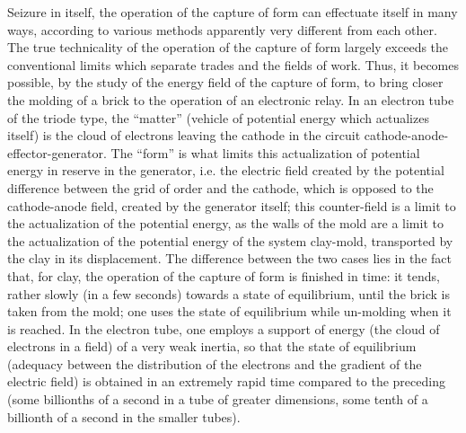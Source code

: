 \documentclass[a4paper]{article}
\begin{document}
Seizure in itself, the operation of the capture of form can effectuate itself in many ways, according to various methods apparently very different from each other. The true technicality of the operation of the capture of form largely exceeds the conventional limits which separate trades and the fields of work. Thus, it becomes possible, by the study of the energy field of the capture of form, to bring closer the molding of a brick to the operation of an electronic relay. In an electron tube of the triode type, the “matter” (vehicle of potential energy which actualizes itself) is the cloud of electrons leaving the cathode in the circuit cathode-anode-effector-generator. The “form” is what limits this actualization of potential energy in reserve in the generator, i.e. the electric field created by the potential difference between the grid of order and the cathode, which is opposed to the cathode-anode field, created by the generator itself; this counter-field is a limit to the actualization of the potential energy, as the walls of the mold are a limit to the actualization of the potential energy of the system clay-mold, transported by the clay in its displacement. The difference between the two cases lies in the fact that, for clay, the operation of the capture of form is finished in time: it tends, rather slowly (in a few seconds) towards a state of equilibrium, until the brick is taken from the mold; one uses the state of equilibrium while un-molding when it is reached. In the electron tube, one employs a support of energy (the cloud of electrons in a field) of a very weak inertia, so that the state of equilibrium (adequacy between the distribution of the electrons and the gradient of the electric field) is obtained in an extremely rapid time compared to the preceding (some billionths of a second in a tube of greater dimensions, some tenth of a billionth of a second in the smaller tubes).
\end{document}
